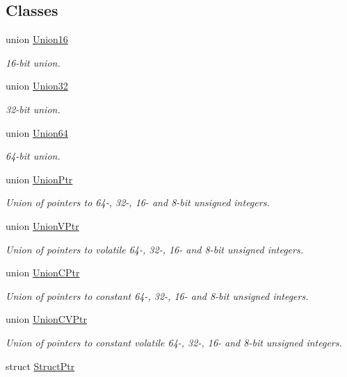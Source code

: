 \subsection*{Classes}
\begin{DoxyCompactItemize}
\item 
union \hyperlink{union_union16}{Union16}
\begin{DoxyCompactList}\small\item\em 16-\/bit union. \end{DoxyCompactList}\item 
union \hyperlink{union_union32}{Union32}
\begin{DoxyCompactList}\small\item\em 32-\/bit union. \end{DoxyCompactList}\item 
union \hyperlink{union_union64}{Union64}
\begin{DoxyCompactList}\small\item\em 64-\/bit union. \end{DoxyCompactList}\item 
union \hyperlink{union_union_ptr}{Union\-Ptr}
\begin{DoxyCompactList}\small\item\em Union of pointers to 64-\/, 32-\/, 16-\/ and 8-\/bit unsigned integers. \end{DoxyCompactList}\item 
union \hyperlink{union_union_v_ptr}{Union\-V\-Ptr}
\begin{DoxyCompactList}\small\item\em Union of pointers to volatile 64-\/, 32-\/, 16-\/ and 8-\/bit unsigned integers. \end{DoxyCompactList}\item 
union \hyperlink{union_union_c_ptr}{Union\-C\-Ptr}
\begin{DoxyCompactList}\small\item\em Union of pointers to constant 64-\/, 32-\/, 16-\/ and 8-\/bit unsigned integers. \end{DoxyCompactList}\item 
union \hyperlink{union_union_c_v_ptr}{Union\-C\-V\-Ptr}
\begin{DoxyCompactList}\small\item\em Union of pointers to constant volatile 64-\/, 32-\/, 16-\/ and 8-\/bit unsigned integers. \end{DoxyCompactList}\item 
struct \hyperlink{struct_struct_ptr}{Struct\-Ptr}

\end{DoxyCompactItemize}
